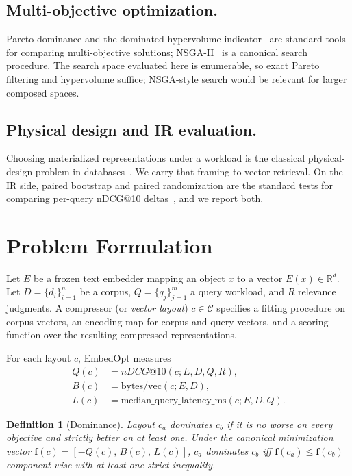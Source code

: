 \documentclass[sigconf]{acmart}
\makeatletter
\newtheorem{definition}{Definition}
\newcommand{\method}{EmbedOpt}
\newcommand{\ndcg}{nDCG@10}
\newcommand{\bpv}{\mathrm{bytes/vec}}
\makeatother
\begin{document}
\subsection{Multi-objective optimization.}
Pareto dominance and the dominated hypervolume indicator~\cite{zitzler1999multiobjective} are standard tools for comparing multi-objective solutions; NSGA-II~\cite{deb2002fast} is a canonical search procedure. The search space evaluated here is enumerable, so exact Pareto filtering and hypervolume suffice; NSGA-style search would be relevant for larger composed spaces.

\subsection{Physical design and IR evaluation.}
Choosing materialized representations under a workload is the classical physical-design problem in databases~\cite{chaudhuri1997self,agrawal2004autoadmin,idreos2018dataalchemist}. We carry that framing to vector retrieval. On the IR side, paired bootstrap and paired randomization are the standard tests for comparing per-query \ndcg{} deltas~\cite{smucker2007comparison,efron1986bootstrap}, and we report both.

\section{Problem Formulation}
\label{sec:problem}

Let $E$ be a frozen text embedder mapping an object $x$ to a vector $E(x) \in \mathbb{R}^{d}$. Let $D = \{d_i\}_{i=1}^{n}$ be a corpus, $Q = \{q_j\}_{j=1}^{m}$ a query workload, and $R$ relevance judgments. A compressor (or \emph{vector layout}) $c \in \mathcal{C}$ specifies a fitting procedure on corpus vectors, an encoding map for corpus and query vectors, and a scoring function over the resulting compressed representations.

For each layout $c$, \method{} measures
\begin{align}
  Q(c) &= \ndcg(c; E, D, Q, R),\\
  B(c) &= \bpv(c; E, D),\\
  L(c) &= \mathrm{median\_query\_latency\_ms}(c; E, D, Q).
\end{align}

\begin{definition}[Dominance]
Layout $c_a$ dominates $c_b$ if it is no worse on every objective and strictly better on at least one. Under the canonical minimization vector $\mathbf{f}(c) = [-Q(c),\, B(c),\, L(c)]$, $c_a$ dominates $c_b$ iff $\mathbf{f}(c_a) \le \mathbf{f}(c_b)$ component-wise with at least one strict inequality.
\end{definition}
\end{document}
